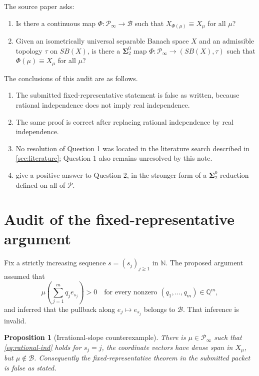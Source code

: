 \documentclass[11pt]{article}
\newtheorem{proposition}[theorem]{Proposition}
\theoremstyle{definition}
\newcommand{\Pcal}{\mathcal P}
\newcommand{\Bcal}{\mathcal B}
\newcommand{\N}{\mathbb N}
\newcommand{\Q}{\mathbb Q}
\newcommand{\equiviso}{\equiv}
\newcommand{\SigmaTwo}{\boldsymbol{\Sigma}^{0}_{2}}
\begin{document}
The source paper asks:
\begin{enumerate}[label=\textbf{Q\arabic*.},leftmargin=2.8em]
\item Is there a continuous map $\Phi:\Pcal_\infty\to\Bcal$ such that
      $X_{\Phi(\mu)}\equiviso X_\mu$ for all $\mu$?
\item Given an isometrically universal separable Banach space $X$ and an
      admissible topology $\tau$ on $SB(X)$, is there a $\SigmaTwo$ map
      $\Phi:\Pcal_\infty\to(SB(X),\tau)$ such that
      $\Phi(\mu)\equiviso X_\mu$ for all $\mu$?
\end{enumerate}

The conclusions of this audit are as follows.
\begin{enumerate}[leftmargin=2.3em]
\item The submitted fixed-representative statement is false as written, because
      rational independence does not imply real independence.
\item The same proof is correct after replacing rational independence by real
      independence.
\item No resolution of Question 1 was located in the literature search described
      in \cref{sec:literature}; Question 1 also remains unresolved by this note.
\item {} give a positive answer to Question 2, in the
      stronger form of a $\SigmaTwo$ reduction defined on all of $\Pcal$.
\end{enumerate}

\section{Audit of the fixed-representative argument}

Fix a strictly increasing sequence $s=(s_j)_{j\geq 1}$ in $\N$.  The proposed
argument assumed that
\[
 \mu\left(\sum_{j=1}^m q_je_{s_j}\right)>0
 \quad\text{for every nonzero }(q_1,\dots,q_m)\in\Q^m,
 \tag{2.1}\label{eq:rational-ind}
\]
and inferred that the pullback along $e_j\mapsto e_{s_j}$ belongs to $\Bcal$.
That inference is invalid.

\begin{proposition}[Irrational-slope counterexample]\label{prop:irrational}
There is $\mu\in\Pcal_\infty$ such that \eqref{eq:rational-ind} holds for
$s_j=j$, the coordinate vectors have dense span in $X_\mu$, but $\mu\notin\Bcal$.
Consequently the fixed-representative theorem in the submitted packet is false
as stated.
\end{proposition}
\end{document}

